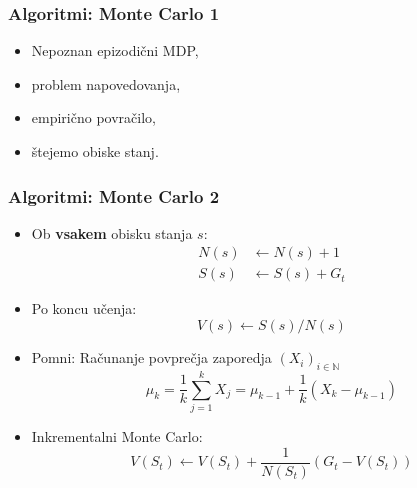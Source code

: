 \documentclass{beamer}    %
\begin{document}
\begin{frame}
    \frametitle{Algoritmi: Monte Carlo 1}
    \begin{itemize}
        \item Nepoznan epizodični MDP, 
        \item problem napovedovanja, 
        \item empirično povračilo, 
        \item štejemo obiske stanj.
    \end{itemize}
\end{frame}


\begin{frame}
    \frametitle{Algoritmi: Monte Carlo 2}
    \begin{itemize}
        \item Ob \textbf{vsakem} obisku stanja $s$: 
        \begin{align*}
            N(s) &\leftarrow N(s) + 1 \\
            S(s) &\leftarrow S(s) + G_t
        \end{align*}
        \item Po koncu učenja: 
        $$
        V(s) \leftarrow S(s) / N(s)
        $$
        \pause
       \item Pomni: Računanje povprečja zaporedja $(X_i)_{i \in \mathbb{N}}$
       $$
       \mu_k = \frac{1}{k} \sum_{j=1}^k X_j = \mu_{k-1} + \frac{1}{k} (X_k - \mu_{k-1})
       $$
       \pause
       \item Inkrementalni Monte Carlo:
       $$
       V(S_t) \leftarrow V(S_t) + \frac{1}{N(S_t)} (G_t - V(S_t))
       $$
    \end{itemize}
\end{frame}
\end{document}
